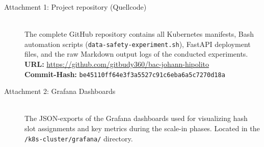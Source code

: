 \documentclass[12pt,a4paper]{report}
\begin{document}
\begin{description}

    \item[Attachment 1: Project repository (Quellcode)] \hfill \\
    The complete GitHub repository contains all Kubernetes manifests, Bash automation scripts (\texttt{data-safety-experiment.sh}), FastAPI deployment files, and the raw Markdown output logs of the conducted experiments. \\
    \textbf{URL:} \url{https://github.com/gitbudy360/bac-johann-hipolito} \\
    \textbf{Commit-Hash:} \texttt{be45110ff64e3f3a5527c91c6eba6a5c7270d18a}

    \item[Attachment 2: Grafana Dashboards] \hfill \\
    The \ac{JSON}-exports of the Grafana dashboards used for visualizing hash slot assignments and key metrics during the scale-in phases. Located in the \texttt{/k8s-cluster/grafana/} directory.

\end{description}
\end{document}
